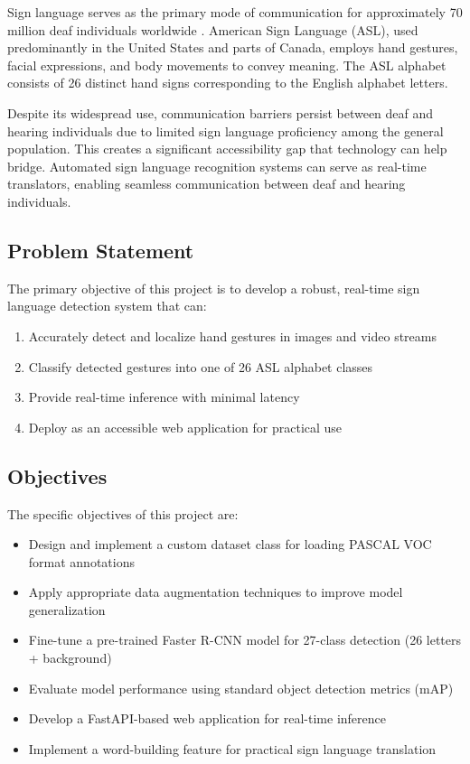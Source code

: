 \documentclass[12pt,a4paper]{article}
\begin{document}
Sign language serves as the primary mode of communication for approximately 70 million deaf individuals worldwide \cite{who2021}. American Sign Language (ASL), used predominantly in the United States and parts of Canada, employs hand gestures, facial expressions, and body movements to convey meaning. The ASL alphabet consists of 26 distinct hand signs corresponding to the English alphabet letters.

Despite its widespread use, communication barriers persist between deaf and hearing individuals due to limited sign language proficiency among the general population. This creates a significant accessibility gap that technology can help bridge. Automated sign language recognition systems can serve as real-time translators, enabling seamless communication between deaf and hearing individuals.

\subsection{Problem Statement}

The primary objective of this project is to develop a robust, real-time sign language detection system that can:

\begin{enumerate}[label=(\alph*)]
    \item Accurately detect and localize hand gestures in images and video streams
    \item Classify detected gestures into one of 26 ASL alphabet classes
    \item Provide real-time inference with minimal latency
    \item Deploy as an accessible web application for practical use
\end{enumerate}

\subsection{Objectives}

The specific objectives of this project are:

\begin{itemize}
    \item Design and implement a custom dataset class for loading PASCAL VOC format annotations
    \item Apply appropriate data augmentation techniques to improve model generalization
    \item Fine-tune a pre-trained Faster R-CNN model for 27-class detection (26 letters + background)
    \item Evaluate model performance using standard object detection metrics (mAP)
    \item Develop a FastAPI-based web application for real-time inference
    \item Implement a word-building feature for practical sign language translation
\end{itemize}
\end{document}
